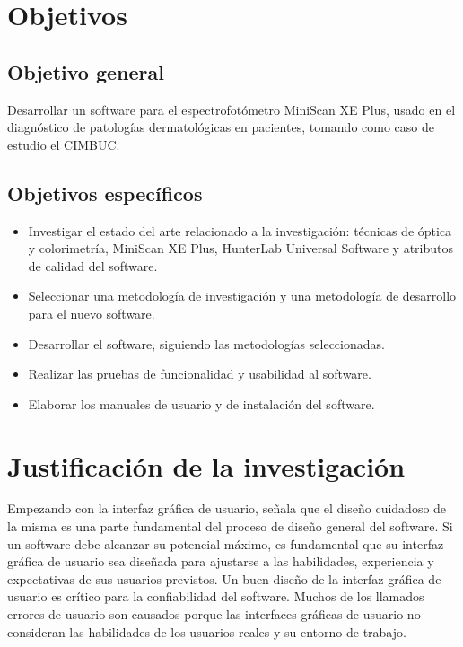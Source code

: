 	\section{Objetivos}

		\subsection{Objetivo general}
	Desarrollar un software para el espectrofot\'{o}metro MiniScan XE Plus, usado en el diagn\'{o}stico de patolog\'{i}as dermatol\'{o}gicas en pacientes, tomando como caso de estudio el CIMBUC.
		\subsection{Objetivos espec\'{i}ficos}
			\begin{itemize}
				\item Investigar el estado del arte relacionado a la investigaci\'{o}n: t\'{e}cnicas de \'{o}ptica y colorimetr\'{i}a, MiniScan XE Plus, HunterLab Universal Software y atributos de calidad del software.
				
				\item Seleccionar una metodolog\'{i}a de investigaci\'{o}n y una metodolog\'{i}a de desarrollo para el nuevo software.
				
				\item Desarrollar el software, siguiendo las metodolog\'{i}as \mbox{seleccionadas}.
				
				\item Realizar las pruebas de funcionalidad y usabilidad al software.
				
				\item Elaborar los manuales de usuario y de instalaci\'{o}n del software.
			\end{itemize}
\newpage
	\section{Justificaci\'{o}n de la investigaci\'{o}n}
	
	Empezando con la interfaz gr\'{a}fica de usuario,  se\~{n}ala que el dise\~{n}o cuidadoso de la misma es una parte fundamental del proceso de dise\~{n}o general del software. Si un software debe alcanzar su potencial m\'{a}ximo, es fundamental que su interfaz gr\'{a}fica de usuario sea dise\~{n}ada para ajustarse a las habilidades, experiencia y expectativas de sus usuarios previstos. Un buen dise\~{n}o de la interfaz gr\'{a}fica de usuario es cr\'{i}tico para la confiabilidad del software. Muchos de los llamados errores de usuario son causados porque las interfaces gr\'{a}ficas de usuario no consideran las habilidades de los usuarios reales y su entorno de trabajo.

